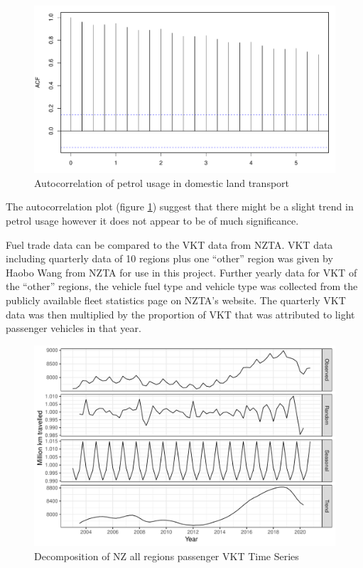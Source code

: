 \documentclass[
]{article}
\begin{document}
\begin{figure}
\centering
\includegraphics{final_report_files/figure-latex/acf_petrol-1.pdf}
\caption{Autocorrelation of petrol usage in domestic land
transport\label{fig:acf_petrol}}
\end{figure}

The autocorrelation plot (figure \ref{fig:acf_petrol}) suggest that
there might be a slight trend in petrol usage however it does not appear
to be of much significance.

Fuel trade data can be compared to the VKT data from NZTA. VKT data
including quarterly data of 10 regions plus one ``other'' region was
given by Haobo Wang from NZTA for use in this project. Further yearly
data for VKT of the ``other'' regions, the vehicle fuel type and vehicle
type was collected from the publicly available fleet statistics page on
NZTA's website. The quarterly VKT data was then multiplied by the
proportion of VKT that was attributed to light passenger vehicles in
that year.

\begin{figure}
\centering
\includegraphics{final_report_files/figure-latex/VKT_ts-1.pdf}
\caption{Decomposition of NZ all regions passenger VKT Time
Series\label{fig:VKT_ts}}
\end{figure}
\end{document}
